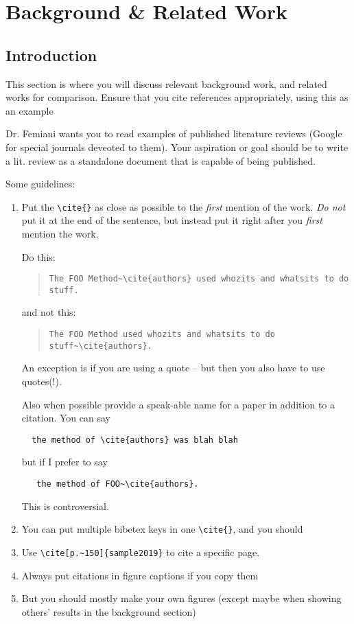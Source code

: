 \chapter{Background \& Related Work}
\label{chap:background}

\section{Introduction}
\label{sec:background:introducton}
This section is where you will discuss relevant background work, and related works for comparison. Ensure that you cite references appropriately, using this as an example~\cite{sample2019}

Dr. Femiani wants you to read examples of published literature reviews (Google for special journals deveoted to them).  Your aspiration or goal should be to write a lit. review as a standalone document that is capable of being published.

 Some guidelines:

\begin{enumerate}
    \item  Put the \verb|\cite{}| as close as possible to the \emph{first} mention of the work.
     \emph{Do not} put it at the end of the sentence, but instead put it right after you \emph{first} mention the work.

     Do this:
\begin{quote}
         \verb|The FOO Method~\cite{authors} used whozits and whatsits to do stuff.|
\end{quote}
     and not this:
    \begin{quote}
         \verb|The FOO Method used whozits and whatsits to do stuff~\cite{authors}.|
    \end{quote}
   An exception is if you are using a quote -- but then you also have to
   use quotes(!).

   Also when possible provide a speak-able name for a paper in addition to
   a citation. You can say
   \begin{verbatim}
  the method of \cite{authors} was blah blah
   \end{verbatim}
   but if I prefer to say
\begin{verbatim}
   the method of FOO~\cite{authors}.
\end{verbatim}
   This is controversial.

\item  You can put multiple bibetex keys in one \verb|\cite{}|, and you should
\item Use \verb|\cite[p.~150]{sample2019}| to cite a specific page.
\item Always put citations in figure captions if you copy them
\item But you should mostly make your own figures (except maybe when showing others' results in the background section)
\end{enumerate}

